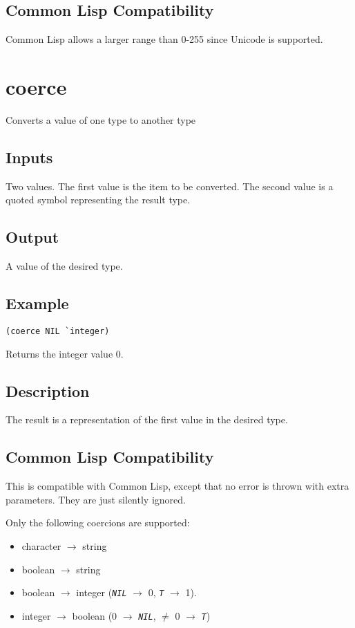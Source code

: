 \documentclass[10pt, openany]{book}
\newcommand{\constant}[1]{\emph{\texttt{#1}}}
\newcommand{\cl}{Common Lisp}
\begin{document}
\subsection{Common Lisp Compatibility}
\cl{} allows a larger range than 0-255 since Unicode is supported.

\section{coerce}
Converts a value of one type to another type
\subsection{Inputs}
Two values.  The first value is the item to be converted.  The second value is a quoted symbol representing the result type.
\subsection{Output}
A value of the desired type.
\subsection{Example}
\begin{lstlisting}
(coerce NIL `integer)
\end{lstlisting}
Returns the integer value 0.
\subsection{Description}
The result is a representation of the first value in the desired type.
\subsection{Common Lisp Compatibility}
This is compatible with \cl, except that no error is thrown with extra parameters.  They are just silently ignored.

Only the following coercions are supported:
\begin{itemize}
  \item character $\rightarrow$ string
  \item boolean $\rightarrow$ string
  \item boolean $\rightarrow$ integer (\constant{NIL} $\rightarrow$ 0, \constant{T} $\rightarrow$ 1).
  \item integer $\rightarrow$ boolean (0 $\rightarrow$ \constant{NIL}, $\neq$ 0 $\rightarrow$ \constant{T})
\end{itemize}
\end{document}
